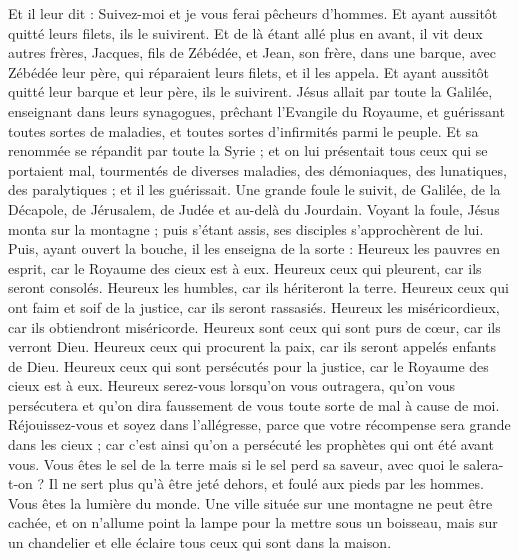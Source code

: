 \begin{multicols}{2}
Et il leur dit : Suivez-moi et je vous ferai pêcheurs d'hommes.
Et ayant aussitôt quitté leurs filets, ils le suivirent.
Et de là étant allé plus en avant, il vit deux autres frères, Jacques, fils de Zébédée, et Jean, son frère, dans une barque, avec Zébédée leur père, qui réparaient leurs filets, et il les appela.
Et ayant aussitôt quitté leur barque et leur père, ils le suivirent.
Jésus allait par toute la Galilée, enseignant dans leurs synagogues, prêchant l'Evangile du Royaume, et guérissant toutes sortes de maladies, et toutes sortes d'infirmités parmi le peuple.
Et sa renommée se répandit par toute la Syrie ; et on lui présentait tous ceux qui se portaient mal, tourmentés de diverses maladies, des démoniaques, des lunatiques, des paralytiques ; et il les guérissait.
Une grande foule le suivit, de Galilée, de la Décapole, de Jérusalem, de Judée et au-delà du Jourdain.
\VerseOne{}Voyant la foule, Jésus monta sur la montagne ; puis s'étant assis, ses disciples s'approchèrent de lui.
Puis, ayant ouvert la bouche, il les enseigna de la sorte :
Heureux les pauvres en esprit, car le Royaume des cieux est à eux.
Heureux ceux qui pleurent, car ils seront consolés.
Heureux les humbles, car ils hériteront la terre.
Heureux ceux qui ont faim et soif de la justice, car ils seront rassasiés.
Heureux les miséricordieux, car ils obtiendront miséricorde.
Heureux sont ceux qui sont purs de cœur, car ils verront Dieu.
Heureux ceux qui procurent la paix, car ils seront appelés enfants de Dieu.
Heureux ceux qui sont persécutés pour la justice, car le Royaume des cieux est à eux.
Heureux serez-vous lorsqu'on vous outragera, qu'on vous persécutera et qu'on dira faussement de vous toute sorte de mal à cause de moi.
Réjouissez-vous et soyez dans l'allégresse, parce que votre récompense sera grande dans les cieux ; car c'est ainsi qu'on a persécuté les prophètes qui ont été avant vous.
Vous êtes le sel de la terre mais si le sel perd sa saveur, avec quoi le salera-t-on ? Il ne sert plus qu'à être jeté dehors, et foulé aux pieds par les hommes.
Vous êtes la lumière du monde. Une ville située sur une montagne ne peut être cachée,
et on n'allume point la lampe pour la mettre sous un boisseau, mais sur un chandelier et elle éclaire tous ceux qui sont dans la maison.

\end{multicols}
